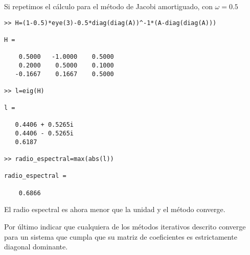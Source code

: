 Si repetimos el cálculo para el método de Jacobi amortiguado, con $\omega=0.5$
\begin{verbatim}
>> H=(1-0.5)*eye(3)-0.5*diag(diag(A))^-1*(A-diag(diag(A)))

H =

    0.5000   -1.0000    0.5000
    0.2000    0.5000    0.1000
   -0.1667    0.1667    0.5000

>> l=eig(H)

l =

   0.4406 + 0.5265i
   0.4406 - 0.5265i
   0.6187          

>> radio_espectral=max(abs(l))

radio_espectral =

    0.6866
\end{verbatim}

El radio espectral es ahora menor que la unidad y el método converge.

Por último indicar que cualquiera de los métodos iterativos descrito converge para un sistema que cumpla que su matriz de coeficientes es estrictamente diagonal dominante.
